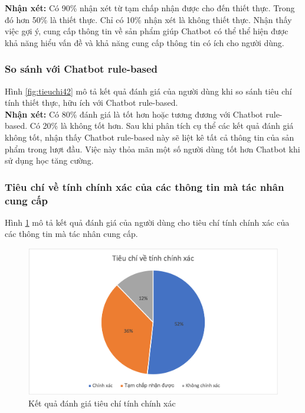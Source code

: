 \textbf{Nhận xét:}
Có 90\% nhận xét từ tạm chấp nhận được cho đến thiết thực. Trong đó hơn 50\% là thiết thực. Chỉ có 10\% nhận xét là không thiết thực. Nhận thấy việc gợi ý, cung cấp thông tin về sản phẩm giúp Chatbot có thể thể hiện được khả năng hiểu vấn đề và khả năng cung cấp thông tin có ích cho người dùng.

\subsubsection{So sánh với Chatbot rule-based}
Hình \ref{fig:tieuchi42} mô tả kết quả đánh giá của người dùng khi so sánh tiêu chí tính thiết thực, hữu ích với Chatbot rule-based.\\

\textbf{Nhận xét:}
Có 80\% đánh giá là tốt hơn hoặc tương đương với Chatbot rule-based. Có 20\% là không tốt hơn. Sau khi phân tích cụ thể các kết quả đánh giá không tốt, nhận thấy Chatbot rule-based này sẽ liệt kê tất cả thông tin của sản phẩm trong lượt đầu. Việc này thỏa mãn một số người dùng tốt hơn Chatbot khi sử dụng học tăng cường.

\subsubsection{Tiêu chí về tính chính xác của các thông tin mà tác nhân cung cấp}
Hình \ref{fig:tieuchi5} mô tả kết quả đánh giá của người dùng cho tiêu chí tính chính xác của các thông tin mà tác nhân cung cấp.

\begin{center}
    \begin{figure}[h!]
        \begin{center}
         \includegraphics[scale=0.91]{chapter7/img/tieuchi5.png}
        \end{center}
        \caption{Kết quả đánh giá tiêu chí tính chính xác}
        \label{fig:tieuchi5}
    \end{figure}
\end{center}

